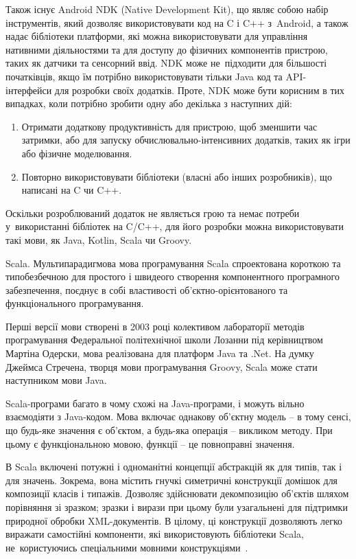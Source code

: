\documentclass[../main.tex]{subfiles}
\begin{document}
Також існує Android NDK (Native Development Kit), що являє собою набір інструментів, який дозволяє використовувати код на C і C++ з~Android, а також надає бібліотеки платформи, які можна використовувати для управління нативними діяльностями та для доступу до фізичних компонентів пристрою, таких як датчики та сенсорний ввід. NDK може не~підходити для більшості початківців, якщо їм потрібно використовувати тільки Java код та API-інтерфейси для розробки своїх додатків. Проте, NDK може бути корисним в тих випадках, коли потрібно зробити одну або декілька з наступних дій:

\begin{enumerate}
	\item Отримати додаткову продуктивність для пристрою, щоб зменшити час затримки, або для запуску обчислювально-інтенсивних додатків, таких як ігри або фізичне моделювання.
	\item Повторно використовувати бібліотеки (власні або інших розробників), що написані на C чи C++.
\end{enumerate}

Оскільки розроблюваний додаток не являється грою та немає потреби у~використанні бібліотек на C/C++, для його розробки можна використовувати такі мови, як Java, Kotlin, Scala чи Groovy.

Scala.
Мультипарадигмова мова програмування Scala спроектована короткою та типобезбечною для простого і швидеого створення компонентного програмного забезпечення, поєднує в собі властивості об'єктно-орієнтованого та функціонального програмування. 

\newpage
Перші версії мови створені в 2003 році колективом лабораторії методів програмування Федеральної політехнічної школи Лозанни під керівництвом Мартіна Одерски, мова реалізована для платформ Java та .Net. На думку Джеймса Стречена, творця мови програмування Groovy, Scala може стати наступником мови Java.

Scala-програми багато в чому схожі на Java-програми, і можуть вільно взаємодіяти з Java-кодом. Мова включає однакову об'єктну модель -- в тому сенсі, що будь-яке значення є об'єктом, а будь-яка операція -- викликом методу. При цьому є функціональною мовою, функції -- це повноправні значення.

В Scala включені потужні і одноманітні концепції абстракцій як для типів, так і для значень. Зокрема, вона містить гнучкі симетричні конструкції домішок для композиції класів і типажів. Дозволяє здійснювати декомпозицію об'єктів шляхом порівняння зі зразком; зразки і вирази при цьому були узагальнені для підтримки природної обробки \mbox{XML-документів}. В цілому, ці конструкції дозволяють легко виражати самостійні компоненти, які використовують бібліотеки Scala, не~користуючись спеціальними мовними конструкціями~\cite{scala}.
\end{document}
